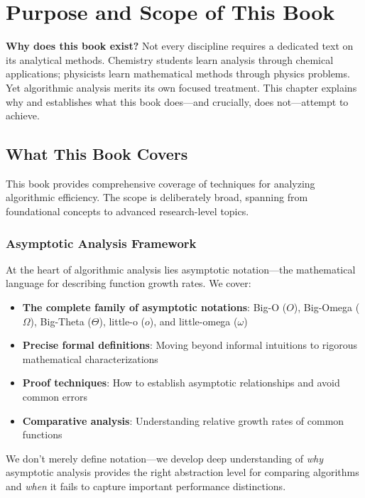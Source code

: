 \chapter{Purpose and Scope of This Book}

\textbf{Why does this book exist?} Not every discipline requires a dedicated text on its analytical methods. Chemistry students learn analysis through chemical applications; physicists learn mathematical methods through physics problems. Yet algorithmic analysis merits its own focused treatment. This chapter explains why and establishes what this book does—and crucially, does not—attempt to achieve.

\section{What This Book Covers}

This book provides comprehensive coverage of techniques for analyzing algorithmic efficiency. The scope is deliberately broad, spanning from foundational concepts to advanced research-level topics.

\subsection{Asymptotic Analysis Framework}

At the heart of algorithmic analysis lies asymptotic notation—the mathematical language for describing function growth rates. We cover:

\begin{itemize}
    \item \textbf{The complete family of asymptotic notations}: Big-O ($O$), Big-Omega ($\Omega$), Big-Theta ($\Theta$), little-o ($o$), and little-omega ($\omega$)
    \item \textbf{Precise formal definitions}: Moving beyond informal intuitions to rigorous mathematical characterizations
    \item \textbf{Proof techniques}: How to establish asymptotic relationships and avoid common errors
    \item \textbf{Comparative analysis}: Understanding relative growth rates of common functions
\end{itemize}
We don't merely define notation—we develop deep understanding of \textit{why} asymptotic analysis provides the right abstraction level for comparing algorithms and \textit{when} it fails to capture important performance distinctions.

